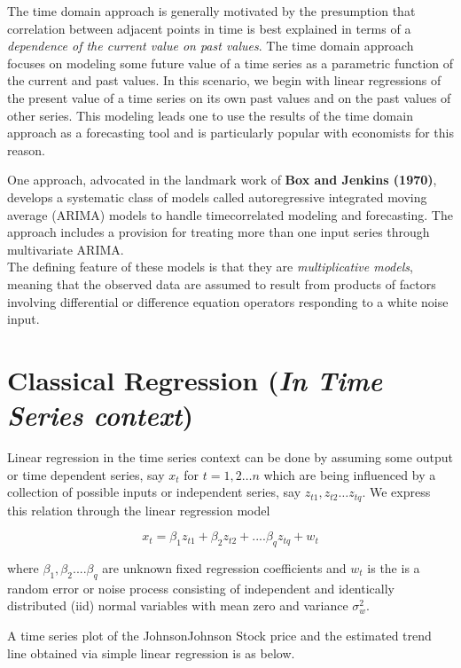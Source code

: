 \documentclass[a4paper]{article}
\theoremstyle{definition}
\begin{document}
The time domain approach is generally motivated by the presumption that correlation between adjacent points in time is best explained in terms of a \textit{dependence of the current value on past values}. The time domain approach focuses on modeling some future value of a time series as a parametric function of the current and past values. In this scenario, we begin with linear regressions of the present value of a time series on its own past values and
on the past values of other series. This modeling leads one to use the results of the time domain approach as a forecasting tool and is particularly popular with economists for this reason.

One approach, advocated in the landmark work of \textbf{Box and Jenkins (1970)}, develops a systematic class of models called autoregressive integrated moving average (ARIMA) models to handle timecorrelated modeling and forecasting. The approach includes a provision for treating more than one input series through multivariate ARIMA.  \\

The defining feature of these models is that they are \textit{multiplicative models}, meaning that the observed data are assumed to result from products of factors involving differential or difference equation operators responding to a white noise input.  


\section{Classical Regression (\textit{In Time Series context})}
Linear regression in the time series context can be done by assuming some output or time dependent series, say $ x_t $ for $ t = 1,2 \dots n $ which are being influenced by a collection of possible inputs or independent series, say $ z_{t1}, z_{t2} \dots z_{tq} $. We express this relation through the linear regression model

\begin{equation}
x_{t}=\beta_{1}z_{t1}+\beta_{2}z_{t2}+....\beta_{q}z_{tq}+w_{t}  
\end{equation}

where $ \beta_1,\beta_2 .... \beta_q $ are unknown fixed regression coefficients and $ w_t $ is the is a random error or noise process consisting of independent and identically
distributed (iid) normal variables with mean zero and variance $ \sigma_{w}^2 $. 

A time series plot of the JohnsonJohnson  Stock price and the estimated trend line obtained via simple linear regression is as below. 
\end{document}
